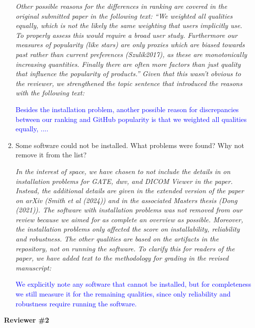 \documentclass[12pt]{casletter}
\begin{document}
\begin{letter}
\begin{enumerate}
  \emph{Other possible reasons for the differences in ranking are covered in the
  original submitted paper in the following text: ``We weighted all qualities
  equally, which is not the likely the same weighting that users implicitly use.
  To properly assess this would require a broad user study.  Furthermore our
  measures of popularity (like stars) are only \emph{proxies} which are biased
  towards past rather than current preferences (Szulik2017), as these are
  monotonically increasing quantities. Finally there are often more factors than
  just quality that influence the popularity of products.''  Given that this
  wasn't obvious to the reviewer, we strengthened the topic sentence that
  introduced the reasons with the following text: \smallskip}

  \textcolor{blue}{Besides the installation problem, another possible reason for
  discrepancies between our ranking and GitHub popularity is that we weighted
  all qualities equally, ....}

  \item Some software could not be installed. What problems were found? Why not
  remove it from the list? \medskip

  \emph{In the interest of space, we have chosen to not include the details in
  on installation problems for \textit{GATE}, \textit{dwv}, and \textit{DICOM
  Viewer} in the paper.  Instead, the additional details are given in the
  extended version of the paper on arXiv (Smith et al (2024)) and in the
  associated Masters thesis (Dong (2021)).  The software with installation
  problems was not removed from our review because we aimed for as complete an
  overview as possible.   Moreover, the installation problems only affected the
  score on installability, reliability and robustness.  The other qualities are
  based on the artifacts in the repository, not on running the software.  To
  clarify this for readers of the paper, we have added text to the methodology
  for grading in the revised manuscript: \smallskip}

  \textcolor{blue}{We explicitly note any software that cannot be installed,
  but for completeness we still measure it for the remaining qualities, since
  only reliability and robustness require running the software.}

  \end{enumerate}

  \textbf{Reviewer \#2}

  \begin{enumerate}
  

\end{enumerate}
\end{letter}
\end{document}
